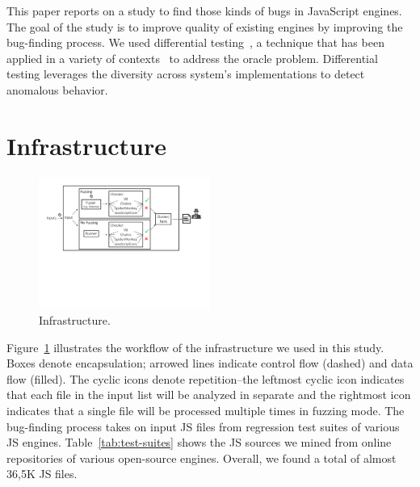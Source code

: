 \documentclass[10pt,conference,anonymous]{IEEEtran}
\begin{document}
This paper reports on a study to find those kinds of bugs in
JavaScript engines. The goal of the study is to improve
quality of existing \js{} engines by improving the bug-finding
process. We used differential testing~\cite{Brumley-etal-ss07}, a
technique that has been applied in a variety of
contexts~\cite{Yang-etal-pldi11,Chen-etal-fse2015,Argyros-etla-ccs16,Chen-etal-pldi16,petsios-etal-sp2017,SivakornAPKJ17}
to address the oracle problem. Differential testing leverages the
diversity across system's implementations to detect anomalous
behavior.  

\section{Infrastructure}
\label{sec:design}


\begin{figure}[t]
  \centering
  \includegraphics[trim=0 250 0 0,clip,width=0.5\textwidth]{google-awards-workflow}  
  \caption{\label{fig:workflow}Infrastructure.}
\end{figure}

Figure~\ref{fig:workflow} illustrates the workflow of the
infrastructure we used in this study. Boxes denote encapsulation;
arrowed lines indicate control flow (dashed) and data flow
(filled). The cyclic icons denote repetition--the leftmost cyclic icon
indicates that each file in the input list will be analyzed in
separate and the rightmost icon indicates that a single file will be
processed multiple times in fuzzing mode. The bug-finding process
takes on input JS files from regression test suites of various JS
engines. Table~\ref{tab:test-suites} shows the JS sources we mined
from online repositories of various open-source engines. Overall, we
found a total of almost 36,5K JS files.
\end{document}
